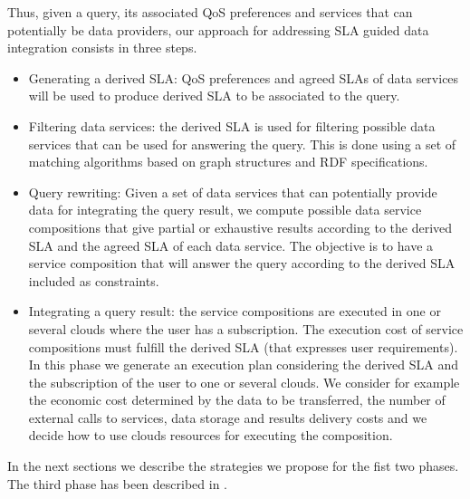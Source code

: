 Thus, given a query, its associated QoS preferences and  services that can potentially be data providers, our approach for addressing SLA guided data  integration consists in three steps.  
\begin{itemize}
\item Generating a derived SLA: QoS preferences and  agreed SLAs of data services  will be used to produce derived SLA to be associated to the query.   
\item Filtering data services: the derived SLA  is used for filtering possible data services that can be used for answering the query. This is done using a set of matching algorithms based on  graph structures and RDF specifications.
\item   Query rewriting: Given a set of data services that can potentially provide data for integrating the query result, we compute possible data service compositions that give partial or exhaustive  results according to the derived SLA and the agreed SLA of each data service. The objective is to have a service composition that will answer the query according to the derived SLA included as constraints. 

\item  Integrating a query result: the service compositions are executed in one or several clouds where the user has a subscription. The execution cost of  service compositions must fulfill the derived SLA (that expresses user requirements). In this phase we generate an execution plan  considering the derived SLA and the subscription of the user to one or several clouds. We consider for example the economic cost determined by the data to be transferred, the number of external calls to services, data storage and results delivery costs and we decide how to use clouds resources for executing the composition. 
\end{itemize}

In the next sections we describe the strategies we propose for the fist two phases. The third phase has been described  in  \cite{Lopez14}.


